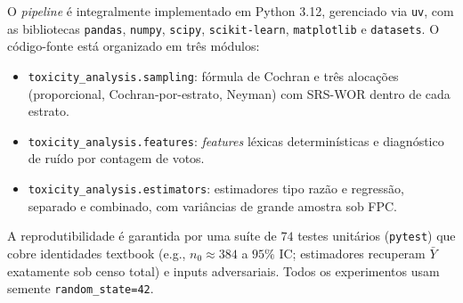 O \textit{pipeline} é integralmente implementado em Python 3.12, gerenciado
via \texttt{uv}, com as bibliotecas \texttt{pandas}, \texttt{numpy},
\texttt{scipy}, \texttt{scikit-learn}, \texttt{matplotlib} e
\texttt{datasets}. O código-fonte está organizado em três módulos:
\begin{itemize}
  \item \texttt{toxicity\_analysis.sampling}: fórmula de Cochran e três
        alocações (proporcional, Cochran-por-estrato, Neyman) com SRS-WOR
        dentro de cada estrato.
  \item \texttt{toxicity\_analysis.features}: \textit{features} léxicas
        determinísticas e diagnóstico de ruído por contagem de votos.
  \item \texttt{toxicity\_analysis.estimators}: estimadores tipo razão e
        regressão, separado e combinado, com variâncias de grande amostra
        sob FPC.
\end{itemize}
A reprodutibilidade é garantida por uma suíte de $74$ testes unitários
(\texttt{pytest}) que cobre identidades textbook (e.g., $n_0 \approx 384$ a
$95\%$ IC; estimadores recuperam $\bar{Y}$ exatamente sob censo total) e
inputs adversariais. Todos os experimentos usam semente
\texttt{random\_state=42}.

